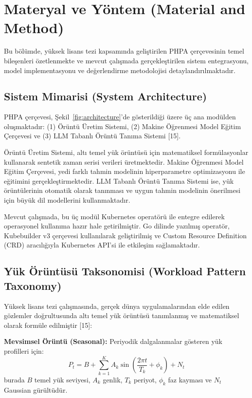 \documentclass[12pt,a4paper]{article}
\begin{document}
\section{Materyal ve Yöntem (Material and Method)}

Bu bölümde, yüksek lisans tezi kapsamında geliştirilen PHPA çerçevesinin temel bileşenleri özetlenmekte ve mevcut çalışmada gerçekleştirilen sistem entegrasyonu, model implementasyonu ve değerlendirme metodolojisi detaylandırılmaktadır.

\subsection{Sistem Mimarisi (System Architecture)}

PHPA çerçevesi, Şekil~\ref{fig:architecture}'de gösterildiği üzere üç ana modülden oluşmaktadır: (1) Örüntü Üretim Sistemi, (2) Makine Öğrenmesi Model Eğitim Çerçevesi ve (3) LLM Tabanlı Örüntü Tanıma Sistemi [15].

Örüntü Üretim Sistemi, altı temel yük örüntüsü için matematiksel formülasyonlar kullanarak sentetik zaman serisi verileri üretmektedir. Makine Öğrenmesi Model Eğitim Çerçevesi, yedi farklı tahmin modelinin hiperparametre optimizasyonu ile eğitimini gerçekleştirmektedir. LLM Tabanlı Örüntü Tanıma Sistemi ise, yük örüntülerinin otomatik olarak tanınması ve uygun tahmin modelinin önerilmesi için büyük dil modellerini kullanmaktadır.

Mevcut çalışmada, bu üç modül Kubernetes operatörü ile entegre edilerek operasyonel kullanıma hazır hale getirilmiştir. Go dilinde yazılmış operatör, Kubebuilder v3 çerçevesi kullanılarak geliştirilmiş ve Custom Resource Definition (CRD) aracılığıyla Kubernetes API'si ile etkileşim sağlamaktadır.

\subsection{Yük Örüntüsü Taksonomisi (Workload Pattern Taxonomy)}

Yüksek lisans tezi çalışmasında, gerçek dünya uygulamalarından elde edilen gözlemler doğrultusunda altı temel yük örüntüsü tanımlanmış ve matematiksel olarak formüle edilmiştir [15]:

\textbf{Mevsimsel Örüntü (Seasonal):} Periyodik dalgalanmalar gösteren yük profilleri için:
\begin{equation}
P_t = B + \sum_{k=1}^{K} A_k \sin\left(\frac{2\pi t}{T_k} + \phi_k\right) + N_t
\end{equation}
burada $B$ temel yük seviyesi, $A_k$ genlik, $T_k$ periyot, $\phi_k$ faz kayması ve $N_t$ Gaussian gürültüdür.
\end{document}
